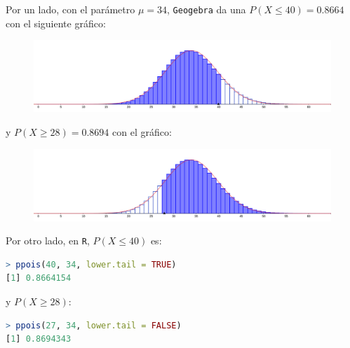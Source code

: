 \begin{sol}
	Por un lado, con el parámetro $\mu=34$, \texttt{Geogebra} da una $P(X\leq 40) = 0.8664$ con el siguiente gráfico:
	\begin{figure}[H]
		\includegraphics[width=0.5\linewidth]{pics/g11-1}
		\centering
	\end{figure}\noindent
	y $P(X\geq 28) = 0.8694$ con el gráfico:
	\begin{figure}[H]
		\includegraphics[width=0.5\linewidth]{pics/g11-2}
		\centering
	\end{figure}\noindent
	Por otro lado, en \texttt{R}, $P(X\leq 40)$ es:
	\begin{lstlisting}[language=R]
> ppois(40, 34, lower.tail = TRUE)
[1] 0.8664154
	\end{lstlisting}
	y $P(X\geq 28)$:
	\begin{lstlisting}[language=R]
> ppois(27, 34, lower.tail = FALSE)
[1] 0.8694343
	\end{lstlisting}
\end{sol}

